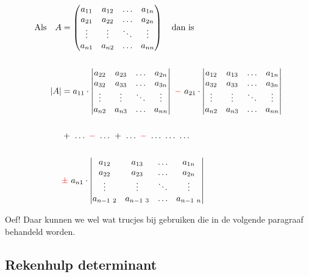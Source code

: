 \newpage
{}   
\begin{align*}
	\text{Als} \quad A  &= 
	\begin{pmatrix}
	   a_{11}  &  a_{12}  & \ldots & a_{1n}\\
	   a_{21}  &  a_{22}  & \ldots & a_{2n}\\
	   \vdots  & \vdots   & \ddots & \vdots\\
	   a_{n1}  &  a_{n2}  & \ldots & a_{nn}
	\end{pmatrix} \quad  \text{dan is} \\ \\
	|A| &= a_{11} \cdot    	 
	\begin{vmatrix}
	   a_{22}  &  a_{23} & \ldots & a_{2n}\\
	   a_{32}  &  a_{33} & \ldots & a_{3n}\\
	   \vdots  &  \vdots & \ddots & \vdots\\
	   a_{n2}  &  a_{n3} & \ldots & a_{nn}
	\end{vmatrix} 
	\ \red{-}  \ a_{21} \cdot  	
	\begin{vmatrix}
	   a_{12} &  a_{13} & \ldots & a_{1n}\\
	   a_{32} &  a_{33} & \ldots & a_{3n}\\
	   \vdots & \vdots  & \ddots & \vdots\\
	   a_{n2} &  a_{n3} & \ldots & a_{nn}
	\end{vmatrix} \\ \\
	& +\ \dots\ \red{-}\ \dots\ +\ \dots\ \red{-}\  \dots\ \dots\ \dots\\ \\
	&\red {\pm \ } a_{n1} \cdot    
	\begin{vmatrix}
	   a_{12} &  a_{13} & \ldots & a_{1n}\\
	   a_{22} &  a_{23} & \ldots & a_{2n}\\
	   \vdots & \vdots  & \ddots & \vdots\\
        a_{n-1 \ 2} & a_{n-1 \ 3} &\ldots & a_{n-1 \ n}
	\end{vmatrix} 
\end{align*}

Oef! Daar kunnen we wel wat trucjes bij gebruiken die in de volgende paragraaf behandeld worden.
\subsection{Rekenhulp determinant}

